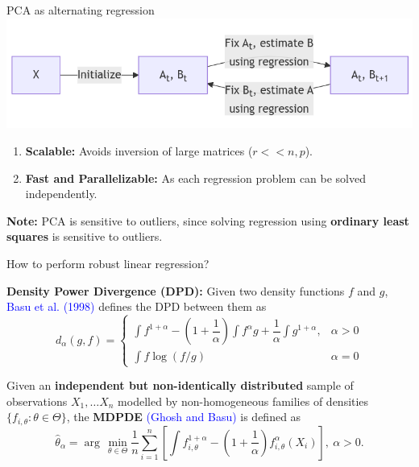 \documentclass[10pt]{beamer}
\begin{document}
\begin{frame}{PCA as alternating regression}
    \includegraphics[width = \textwidth]{figures/thesis_slides/diagram.png}
    \begin{enumerate}
        \item \textbf{Scalable:} Avoids inversion of large matrices ($r << n, p$).
        \item \textbf{Fast and Parallelizable:} As each regression problem can be solved independently. 
    \end{enumerate}
    \pause
    \textbf{Note:} PCA is sensitive to outliers, since solving regression using \textbf{ordinary least squares} is sensitive to outliers.
\end{frame}

\begin{frame}{How to perform robust linear regression?}

    \begin{tcolorbox}[colback=green!5!white,colframe=green!75!black]
        \textbf{Density Power Divergence (DPD):} Given two density functions $f$ and $g$, \textcolor{blue}{Basu et al. (1998)} defines the DPD between them as
        \begin{equation*}
            d_\alpha(g, f) = \begin{cases}
                \displaystyle\int f^{1+\alpha} - \left(1+ \dfrac{1}{\alpha} \right)\displaystyle\int f^\alpha g + \dfrac{1}{\alpha} \displaystyle\int g^{1+\alpha}, & \alpha > 0\\
                \displaystyle\int f \log(f / g) & \alpha = 0
            \end{cases}
        \end{equation*}
    \end{tcolorbox}
    \pause
    \vspace*{0.5cm}
    Given an \textbf{independent but non-identically distributed} sample of observations $X_1, \dots X_n$ modelled by non-homogeneous families of densities $\{ f_{i,\theta}: \theta \in \Theta \}$, the \textbf{MDPDE} \textcolor{blue}{(Ghosh and Basu)} is defined as 
    \begin{equation*}
        \widehat{\theta}_\alpha = \arg\,\min_{\theta \in \Theta} \dfrac{1}{n}\sum_{i=1}^n \left[ \int f_{i, \theta}^{1+\alpha} - \left( 1 + \dfrac{1}{\alpha} \right) f_{i,\theta}^\alpha(X_i) \right], \ \alpha > 0.
    \end{equation*}
\end{frame}
\end{document}

